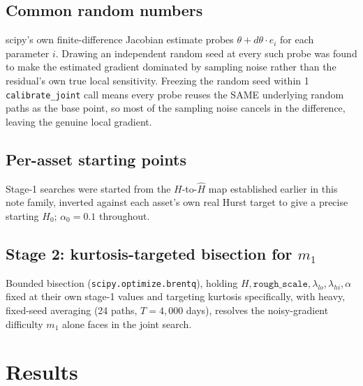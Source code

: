 \documentclass[11pt]{article}
\begin{document}
\subsection{Common random numbers}
\label{sec:crn}
scipy's own finite-difference Jacobian estimate probes
$\theta+d\theta\cdot e_i$ for each parameter $i$. Drawing an independent
random seed at every such probe was found to make the estimated gradient
dominated by sampling noise rather than the residual's own true local
sensitivity. Freezing the random seed within 1 \texttt{calibrate\_joint}
call means every probe reuses the SAME underlying random paths as the
base point, so most of the sampling noise cancels in the difference,
leaving the genuine local gradient.

\subsection{Per-asset starting points}
Stage-1 searches were started from the $H$-to-$\hat H$ map established
earlier in this note family, inverted against each asset's own real
Hurst target to give a precise starting $H_0$; $\alpha_0=0.1$ throughout.

\subsection{Stage 2: kurtosis-targeted bisection for $m_1$}
Bounded bisection (\texttt{scipy.optimize.brentq}), holding
$H,\texttt{rough\_scale},\lambda_{lo},\lambda_{hi},\alpha$ fixed at their
own stage-1 values and targeting kurtosis specifically, with heavy,
fixed-seed averaging (24 paths, $T=4{,}000$ days), resolves the
noisy-gradient difficulty $m_1$ alone faces in the joint search.

\FloatBarrier
\section{Results}
\label{sec:results}
\end{document}
